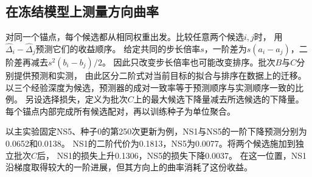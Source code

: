 \subsection{在冻结模型上测量方向曲率}
对同一个锚点，每个候选都从相同权重出发。比较任意两个候选$i,j$时，
用$\widehat\Delta_i-\widehat\Delta_j$预测它们的收益顺序。
给定共同的步长倍率$s$，一阶差为$s(a_i-a_j)$，二阶差再减去$s^2(b_i-b_j)/2$。
因此只改变步长倍率也可能改变排序。批次$B$与$C$分别提供预测和实测，
由此区分二阶式对当前目标的拟合与排序在数据上的迁移。
以三个经验深度为候选，预测器的成对一致率等于预测顺序与实测顺序一致的比例。
另设选择损失，定义为批次$C$上的最大候选下降量减去所选候选的下降量。
每个锚点内部完成所有候选配对，再以训练种子为单位聚合。

以主实验固定NS5、种子0的第250次更新为例，NS1与NS5的一阶下降预测分别为0.0652和0.0138。
NS1的二阶代价为0.1813，NS5为0.0077。将两个候选施加到独立批次$C$后，
NS1的损失上升0.1306，NS5的损失下降0.0037。
在这一位置，NS1沿梯度取得较大的一阶进展，但其方向上的曲率消耗了这份收益。



